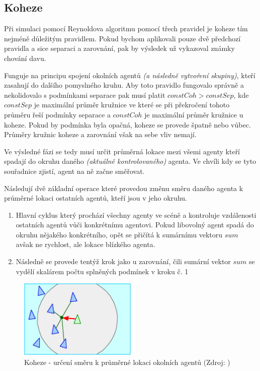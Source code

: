 \documentclass[czech,public,dept460,male,cpdeclaration]{diploma}
\begin{document}
\subsection{Koheze}\label{sec:koheze}
Při simulaci pomocí Reynoldova algoritmu pomocí třech pravidel je koheze tím nejméně důležitým pravidlem. Pokud bychom aplikovali pouze dvě předchozí pravidla a sice separaci a zarovnání, pak by výsledek už vykazoval známky chování davu.

Funguje na principu spojení okolních agentů \textit{(a následně vytvoření skupiny)}, kteří zasahují do dalšího pomyslného kruhu. Aby toto pravidlo fungovalo správně a nekolidovalo s podmínkami separace pak musí platit \(constCoh > constSep\), kde \(constSep\) je maximální průměr kružnice ve které se při překročení tohoto průměru řeší podmínky separace a \(constCoh\) je maximální průměr kružnice u koheze. Pokud by podmínka byla opačná, koheze se provede špatně nebo vůbec. Průměry kružnic koheze a zarovnání však na sebe vliv nemají.

Ve výsledné fázi se tedy musí určit průměrná lokace mezi všemi agenty kteří spadají do okruhu daného \textit{(aktuálně kontrolovaného)} agenta. Ve chvíli kdy se tyto souřadnice zjistí, agent na ně začne směřovat.

Následují dvě základní operace které provedou změnu směru daného agenta k průměrné lokaci ostatních agentů, kteří jsou v jeho okruhu.

\begin{enumerate}
	\item Hlavní cyklus který prochází všechny agenty ve scéně a kontroluje vzdálenosti ostatních agentů vůči konkrétnímu agentovi. Pokud libovolný agent spadá do okruhu nějakého konkrétního, opět se přičítá k sumárnímu vektoru \(sum\) avšak ne rychlost, ale lokace blízkého agenta.
	\item Následně se provede tentýž krok jako u zarovnání, čili sumární vektor \(sum\) se vydělí skalárem počtu splněných podmínek v kroku č. 1
	
\end{enumerate}

\begin{figure}[H]\centering\includegraphics[width=0.5\textwidth]{Figures/cohesion.jpg}
	\caption{Koheze - určení směru k průměrné lokaci okolních agentů (Zdroj: \cite{link2})}
\end{figure}
\end{document}
